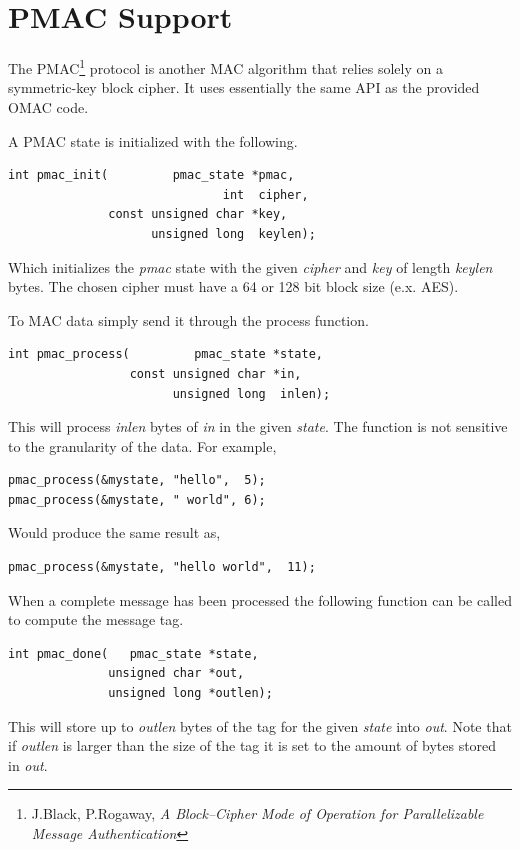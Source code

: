 \documentclass[synpaper]{book}
\newcommand{\mysection}[1]    %
	{                   %
	\section{#1}
   \markboth{\textsf{www.libtom.net}}{\thesection ~ {#1}}
	}
\begin{document}
\mysection{PMAC Support}
The PMAC\footnote{J.Black, P.Rogaway, \textit{A Block--Cipher Mode of Operation for Parallelizable Message Authentication}}
protocol is another MAC algorithm that relies solely on a symmetric-key block cipher.  It uses essentially the same
API as the provided OMAC code.

A PMAC state is initialized with the following.

\begin{verbatim}
int pmac_init(         pmac_state *pmac,
                              int  cipher,
              const unsigned char *key,
                    unsigned long  keylen);
\end{verbatim}
Which initializes the \textit{pmac} state with the given \textit{cipher} and \textit{key} of length \textit{keylen} bytes.  The chosen cipher
must have a 64 or 128 bit block size (e.x. AES).

To MAC data simply send it through the process function.

\begin{verbatim}
int pmac_process(         pmac_state *state,
                 const unsigned char *in,
                       unsigned long  inlen);
\end{verbatim}
This will process \textit{inlen} bytes of \textit{in} in the given \textit{state}.  The function is not sensitive to the granularity of the
data.  For example,

\begin{verbatim}
pmac_process(&mystate, "hello",  5);
pmac_process(&mystate, " world", 6);
\end{verbatim}

Would produce the same result as,

\begin{verbatim}
pmac_process(&mystate, "hello world",  11);
\end{verbatim}

When a complete message has been processed the following function can be called to compute the message tag.

\begin{verbatim}
int pmac_done(   pmac_state *state,
              unsigned char *out,
              unsigned long *outlen);
\end{verbatim}
This will store up to \textit{outlen} bytes of the tag for the given \textit{state} into \textit{out}.  Note that if \textit{outlen} is larger
than the size of the tag it is set to the amount of bytes stored in \textit{out}.
\end{document}
